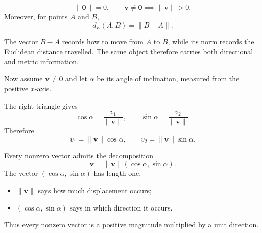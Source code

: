 \begin{theorembox}
\[
\boxed{\|\mathbf0\|=0},
\qquad
\boxed{\mathbf v\neq\mathbf0\implies\|\mathbf v\|>0}.
\]
Moreover, for points $A$ and $B$,
\[
\boxed{d_E(A,B)=\|B-A\|}.
\]
\end{theorembox}

\begin{interpretationbox}
The vector $B-A$ records how to move from $A$ to $B$, while its norm records the
Euclidean distance travelled. The same object therefore carries both directional
and metric information.
\end{interpretationbox}

Now assume $\mathbf v\neq\mathbf0$ and let $\alpha$ be its angle of inclination,
measured from the positive $x$-axis.

\begin{derivationbox}
The right triangle gives
\[
\cos\alpha=\frac{v_1}{\|\mathbf v\|},
\qquad
\sin\alpha=\frac{v_2}{\|\mathbf v\|}.
\]
Therefore
\[
v_1=\|\mathbf v\|\cos\alpha,
\qquad
v_2=\|\mathbf v\|\sin\alpha.
\]
\end{derivationbox}

\begin{theorembox}
Every nonzero vector admits the decomposition
\[
\boxed{
\mathbf v=\|\mathbf v\|(\cos\alpha,\sin\alpha)
}.
\]
The vector $(\cos\alpha,\sin\alpha)$ has length one.
\end{theorembox}

\begin{interpretationbox}
\begin{itemize}
    \item $\|\mathbf v\|$ says how much displacement occurs;
    \item $(\cos\alpha,\sin\alpha)$ says in which direction it occurs.
\end{itemize}
Thus every nonzero vector is a positive magnitude multiplied by a unit direction.
\end{interpretationbox}
